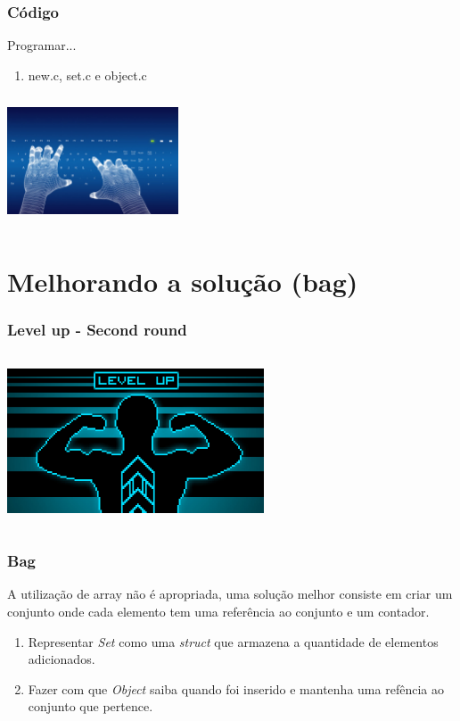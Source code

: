 \documentclass{beamer}
\begin{document}
\begin{frame}
  \frametitle{Código}
  Programar...
  \begin{enumerate}
   \item new.c, set.c e object.c
  \end{enumerate}

  \begin{center}
    \includegraphics[height = 1.5in, width = 2in]{image/programming.jpg}
  \end{center}
\end{frame}

\section{Melhorando a solução (bag)}

\begin{frame}
 \frametitle{Level up - Second round}
 \begin{center}
    \includegraphics[height = 2in, width = 3in]{image/levelup.jpg}
  \end{center}
\end{frame}

\begin{frame}
 \frametitle{Bag}
  A utilização de array não é apropriada, uma solução melhor consiste em criar 
  um conjunto onde cada elemento tem uma referência ao conjunto e um contador.

  \begin{enumerate}
   \item Representar \textit{Set} como uma \textit{struct} que armazena a 
     quantidade de elementos adicionados.
   \item Fazer com que \textit{Object} saiba quando foi inserido e mantenha uma 
    refência ao conjunto que pertence.
  \end{enumerate}

\end{frame}
\end{document}
